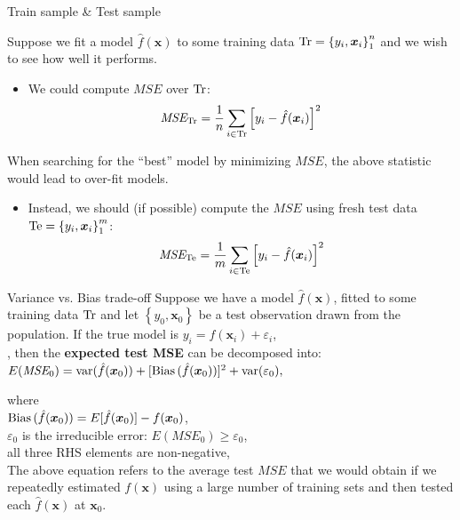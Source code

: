 \documentclass{beamer}
\begin{document}
\begin{frame}{Train sample \& Test sample}

Suppose we fit a model $\hat{f}(\bm{x})$ to some training data $\textnormal{Tr}=\left\lbrace y_i, \bm{x}_i \right\rbrace _1 ^n$ and we wish to see how well it performs.

\begin{itemize}
\item We could compute $\textit{MSE}$ over $\textnormal{Tr}$:
$$ \textit{MSE}_{\textnormal{Tr}} = \frac{1}{n}
   \sum_{i \in \textnormal{Tr}}
   \left[y_i - \hat{f}(\bm{x}_i) \right]^2 $$
\end{itemize}

When searching for the ``best'' model by minimizing $ \textit{MSE}$, the above statistic would lead to over-fit models.
\medskip
\begin{itemize}
\item Instead, we should (if possible) compute the $ \textit{MSE}$ using fresh test
data $\textnormal{Te}=\left\lbrace y_i, \bm{x}_i \right\rbrace _1 ^m$:
$$ \textit{MSE}_{\textnormal{Te}} = \frac{1}{m}
    \sum_{i \in \textnormal{Te}}
   \left[y_i - \hat{f}(\bm{x}_i) \right]^2 $$
\end{itemize}
\end{frame}
\begin{frame}{Variance vs. Bias trade-off}
Suppose we have a model $\hat{f}(\bm{x})$, fitted to some training data $\textnormal{Tr}$ and let $\left\lbrace y_0, \bm{x}_0 \right\rbrace$ be a test observation drawn from the population. If the true model is $y_i = f(\bm{x}_i) + \varepsilon_i$, \\[with $f(\bm{x}_i)= \textnormal{E}(y_i | \bm{x}_i )$],
then the \textbf{expected test MSE} can be decomposed into:\\

\medskip
$E(\textit{MSE}_0)
   = \textnormal{var}(\hat{f}(\bm{x}_0))
   + [\textnormal{Bias\,}(\hat{f}(\bm{x}_0))]^2
   + \textnormal{var}(\varepsilon_0),$

where\\
\smallskip
$\textnormal{Bias\,}(\hat{f}(\bm{x}_0)) 
       = E[\hat{f}(\bm{x}_0)]
       - f(\bm{x}_0)$,\\
$\varepsilon_0$ is the irreducible error: $E(\textit{MSE}_0) \geq \varepsilon_0$,\\ 
all three RHS elements are non-negative,\\
\smallskip
The above equation refers to the average test $\textit{MSE}$ that we would obtain if we repeatedly estimated $f(\bm{x})$ using a large number of training sets and then tested each $\hat{f}(\bm{x})$ at $\bm{x}_0$.
\end{frame}
\end{document}
